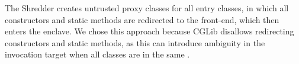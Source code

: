 The Shredder creates untrusted proxy classes for all entry classes,
in which all constructors and static methods are redirected to
the \sysname{} front-end, which then enters the enclave.
We chose this approach because CGLib disallows redirecting 
constructors and static methods, as this can introduce ambiguity in
the invocation target when all classes are in the same \jvm{}.




